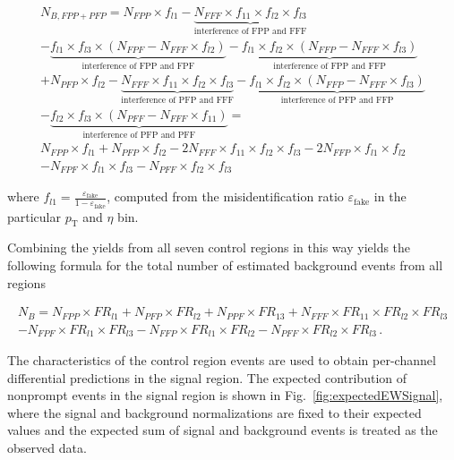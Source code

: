 \begin{multline*}
N_{B,FPP + PFP} = N_{FPP} \times f_{l1}
  - \underbrace{N_{FFF} \times f_{11} \times f_{l2} \times f_{l3}}_{\textrm{interference of FPP and FFF}} \\
  - \underbrace{f_{l1} \times f_{l3} \times (N_{FPF} - N_{FFF} \times f_{l2} )}_{\textrm{interference of FPP and FPF}}
- \underbrace{f_{l1} \times f_{l2} \times (N_{FFP} - N_{FFF} \times f_{l3})}_{\textrm{interference of FPP and FFP}}\\
 + N_{PFP} \times f_{l2} -  \underbrace{N_{FFF} \times f_{11} \times f_{l2} \times f_{l3}}_{\textrm{interference of PFP and FFF}}
 - \underbrace{f_{l1} \times f_{l2} \times (N_{FFP} - N_{FFF}  \times f_{l3})}_{\textrm{interference of PFP and FFP}}\\
  - \underbrace{f_{l2} \times f_{l3} \times (N_{PFF} -  N_{FFF} \times f_{11} )}_{\textrm{interference of PFP and PFF}} = \\
  N_{FPP} \times f_{l1} +  N_{PFP} \times f_{l2} - 2 N_{FFF} \times f_{11} \times f_{l2} \times f_{l3}
   - 2 N_{FFP} \times f_{l1} \times f_{l2} \\ - N_{FPF} \times f_{l1} \times f_{l3} -  N_{PFF} \times f_{l2} \times f_{l3}
\end{multline*}

where $f_{l1} = \frac{\varepsilon_{\text{fake}}}{1 - \varepsilon_{\text{fake}}}$, 
computed from the misidentification ratio $\varepsilon_{\text{fake}}$ in the 
particular $p_{\text{T}}$ and $\eta$ bin.

Combining the yields from all seven control regions in this way yields the following formula
for the total number of estimated background events from all regions 

\begin{align*}
N_B = N_{FPP} \times FR_{l1} + N_{PFP} \times FR_{l2} + N_{PPF} \times FR_{13} 
 + N_{FFF} \times FR_{11} \times FR_{l2} \times FR_{l3}  \\
- N_{FPF} \times FR_{l1} \times FR_{l3} - N_{FFP} \times FR_{l1} \times FR_{l2} - N_{PFF} \times FR_{l2} \times FR_{l3} \,.
\label{eqn:fakerate}
\end{align*}

The characteristics of the control region events
are used to obtain per-channel differential predictions in the signal region.
The expected contribution of nonprompt events in the signal region is shown
in Fig.~\ref{fig:expectedEWSignal}, where the signal and background 
normalizations are fixed to their expected
values and the expected sum of signal and background events is treated as the 
observed data.


